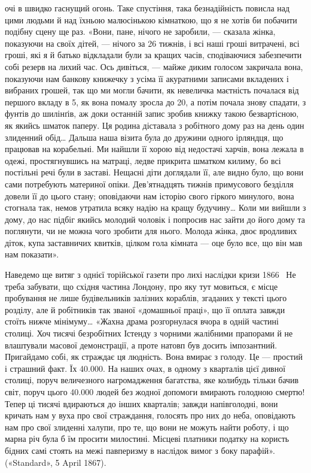 \parcont{}  %
очі в швидко гаснущий огонь. Таке спустіння, така безнадійність
повисла над цими людьми й над їхньою малюсінькою кімнаткою,
що я не хотів би побачити подібну сцену ще раз. «Вони,
пане, нічого не заробили, — сказала жінка, показуючи на своїх
дітей, — нічого за 26 тижнів, і всі наші гроші витрачені, всі гроші,
які я й батько відкладали були за кращих часів, сподіваючися
забезпечити собі резерв на лихий час. Ось дивіться, — майже
диким голосом закричала вона, показуючи нам банкову книжечку
з усіма її акуратними записами вкладених і вибраних грошей,
так що ми могли бачити, як невеличка маєтність почалася
від першого вкладу в 5, як вона помалу зросла до
20, а потім почала знову спадати, з фунтів до
шилінґів, аж доки останній запис зробив книжку такою безвартісною,
як якийсь шматок паперу. Ця родина діставала з робітного
дому раз на день один злиденний обід\dots{} Дальша наша візита
була до дружини одного ірляндця, що працював на корабельні.
Ми найшли її хорою від недостачі харчів, вона лежала в одежі,
простягнувшись на матраці, ледве прикрита шматком килиму,
бо всі постільні речі були в заставі. Нещасні діти доглядали її,
але видно було, що вони сами потребують материної опіки.
Дев’ятнадцять тижнів примусового безділля довели її до цього
стану; оповідаючи нам історію свого гіркого минулого, вона
стогнала так, немов утратила всяку надію на кращу будучину\dots{}
Коли ми вийшли з дому, до нас підбіг якийсь молодий чоловік
і попросив нас зайти до його дому та поглянути, чи не можна
чого зробити для нього. Молода жінка, двоє вродливих діток,
купа заставничих квитків, цілком гола кімната — оце було все,
що він мав нам показати».

Наведемо ще витяг з однієї торійської газети про лихі наслідки
кризи 1866~ Не треба забувати, що східня частина Лондону,
про яку тут мовиться, є місце пробування не лише будівельників
залізних кораблів, згаданих у тексті цього розділу, але й
робітників так званої «домашньої праці», що її оплата завжди
стоїть нижче мінімуму\dots{} «Жахна драма розгорнулася вчора в
одній частині столиці. Хоч тисячі безробітних Істенду з чорними
жалібними прапорами й не влаштували масової демонстрації,
а проте натовп був досить імпозантний. Пригайдамо собі, як
страждає ця людність. Вона вмирає з голоду. Це — простий і
страшний факт. Їх \num{40.000}. На наших очах, в одному з кварталів
цієї дивної столиці, поруч величезного нагромадження багатства,
яке колибудь тільки бачив світ, поруч цього \num{40.000} людей без
жодної допомоги вмирають голодною смертю! Тепер ці тисячі
вдираються до інших кварталів; завжди напівголодні, вони кричать
нам у вуха про свої страждання, голосять про них до
неба, оповідають нам про свої злиденні халупи, про те, що вони
не можуть найти роботу, і що марна річ була б їм просити
милостині. Місцеві платники податку на користь бідних самі
стоять на межі павперизму в наслідок вимог з боку парафій».
(«Standard», 5 April 1867).
